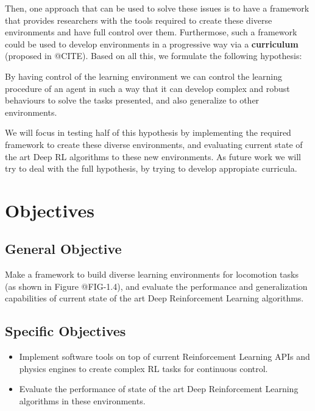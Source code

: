 Then, one approach that can be used to solve these issues is to have a framework
that provides researchers with the tools required to create these diverse environments
and have full control over them. Furthermose, such a framework could be used to develop
environments in a progressive way via a \textbf{curriculum} (proposed in @CITE). Based on
all this, we formulate the following hypothesis:

\begin{hypothesis}
	By having control of the learning environment we can control the learning procedure
	of an agent in such a way that it can develop complex and robust behaviours to solve
	the tasks presented, and also generalize to other environments.
\end{hypothesis}

We will focus in testing half of this hypothesis by implementing the required framework
to create these diverse environments, and evaluating current state of the art Deep RL algorithms
to these new environments. As future work we will try to deal with the full hypothesis, by
trying to develop appropiate curricula.

\figEnvManipSimToreal

\figEnvironmentsProposalFromTo

\section{Objectives}
\label{sec:objectives}

\subsection*{General Objective}
Make a framework to build diverse learning environments for locomotion tasks (as shown in Figure @FIG-1.4), 
and evaluate the performance and generalization capabilities of current state of the art Deep 
Reinforcement Learning algorithms.

\subsection*{Specific Objectives}
\begin{itemize}
 \item Implement software tools on top of current Reinforcement Learning APIs and physics engines 
       to create complex RL tasks for continuous control.
 \item Evaluate the performance of state of the art Deep Reinforcement Learning algorithms in these environments.
\end{itemize}

